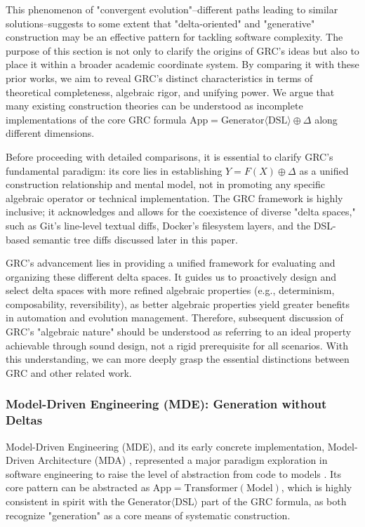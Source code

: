 \documentclass[11pt]{article}
\begin{document}
This phenomenon of "convergent evolution"--different paths leading to similar solutions--suggests to some extent that "delta-oriented" and "generative" construction may be an effective pattern for tackling software complexity. The purpose of this section is not only to clarify the origins of GRC's ideas but also to place it within a broader academic coordinate system. By comparing it with these prior works, we aim to reveal GRC's distinct characteristics in terms of theoretical completeness, algebraic rigor, and unifying power. We argue that many existing construction theories can be understood as incomplete implementations of the core GRC formula $\text{App} = \text{Generator}\langle\text{DSL}\rangle \oplus \Delta$ along different dimensions.

Before proceeding with detailed comparisons, it is essential to clarify GRC's fundamental paradigm: its core lies in establishing $ Y = F(X) \oplus \Delta$ as a unified construction relationship and mental model, not in promoting any specific algebraic operator or technical implementation. The GRC framework is highly inclusive; it acknowledges and allows for the coexistence of diverse "delta spaces," such as Git's line-level textual diffs, Docker's filesystem layers, and the DSL-based semantic tree diffs discussed later in this paper.

GRC's advancement lies in providing a unified framework for evaluating and organizing these different delta spaces. It guides us to proactively design and select delta spaces with more refined algebraic properties (e.g., determinism, composability, reversibility), as better algebraic properties yield greater benefits in automation and evolution management. Therefore, subsequent discussion of GRC's "algebraic nature" should be understood as referring to an ideal property achievable through sound design, not a rigid prerequisite for all scenarios. With this understanding, we can more deeply grasp the essential distinctions between GRC and other related work.

\subsubsection{Model-Driven Engineering (MDE): Generation without Deltas}

Model-Driven Engineering (MDE), and its early concrete implementation, Model-Driven Architecture (MDA) \cite{omg2003}, represented a major paradigm exploration in software engineering to raise the level of abstraction from code to models \cite{schmidt2006}. Its core pattern can be abstracted as $\text{App} = \text{Transformer}(\text{Model})$, which is highly consistent in spirit with the $\text{Generator}\langle\text{DSL}\rangle$ part of the GRC formula, as both recognize "generation" as a core means of systematic construction.
\end{document}
